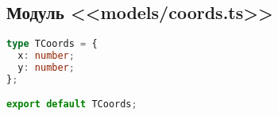 \subsection{Модуль <<models/coords.ts>>}
\begin{lstlisting}[language=typescript]
type TCoords = {
  x: number;
  y: number;
};

export default TCoords;
\end{lstlisting}
